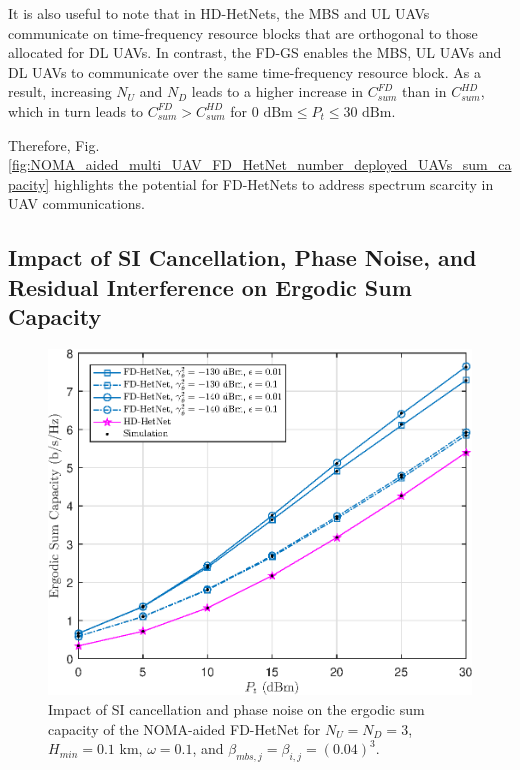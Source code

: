 It is also useful to note that in HD-HetNets, the MBS and UL UAVs communicate on time-frequency resource blocks that are orthogonal to those allocated for DL UAVs. In contrast, the FD-GS enables the MBS, UL UAVs and DL UAVs to communicate over the same time-frequency resource block. As a result, increasing $N_U$ and $N_D$ leads to a higher increase in $C_{sum}^{FD}$ than in $C_{sum}^{HD}$, which in turn leads to $C_{sum}^{FD} > C_{sum}^{HD}$ for $0\text{ dBm} \leq P_t \leq 30\text{ dBm}$.

Therefore, Fig. \ref{fig:NOMA_aided_multi_UAV_FD_HetNet_number_deployed_UAVs_sum_capacity} highlights the potential for FD-HetNets to address spectrum scarcity in UAV communications.


\subsection{Impact of SI Cancellation, Phase Noise, and Residual Interference on Ergodic Sum Capacity}

\begin{figure}[th]
\centering \vspace{0.1cm}
\includegraphics [width=0.45\columnwidth]{chap7_fig/phase_noise_epsilon_sum_capacity.eps}
\caption{Impact of SI cancellation and phase noise on the ergodic sum capacity of the NOMA-aided FD-HetNet for $N_U = N_D = 3$, $H_{min} = 0.1$ km, $\omega = 0.1$, and $\beta_{mbs,j} = \beta_{i,j} = (0.04)^3$.}
\label{fig:NOMA_aided_multi_UAV_FD_HetNet_phase_noise_epsilon_sum_capacity}
\end{figure}

